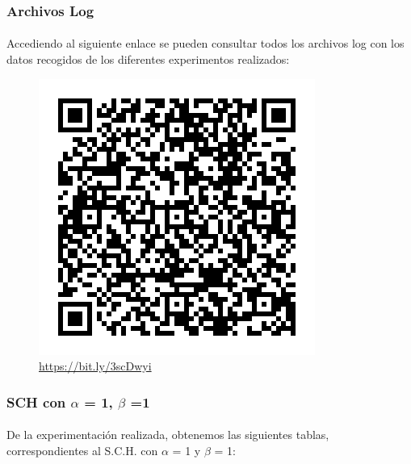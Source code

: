 		\subsubsection{Archivos Log}
		
		\paragraph{}Accediendo al siguiente enlace se pueden consultar todos los archivos log con los datos recogidos de los diferentes experimentos realizados:
		
		\begin{figure}[H]
			\centering
			\includegraphics[scale=0.5]{img/qr_img.png}
			\caption{\url{https://bit.ly/3scDwyi}}
			\label{archivos_log}
		\end{figure}
	
		\subsubsection{SCH con $\alpha$ = 1, $\beta$ =1}
		
		\paragraph{}De la experimentación realizada, obtenemos las siguientes tablas, correspondientes al S.C.H. con $\alpha$ = 1 y $\beta$ = 1:
		
